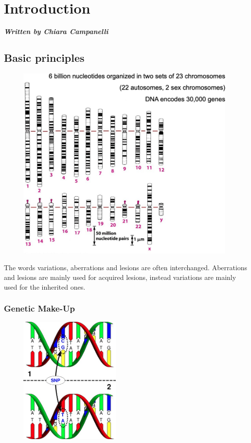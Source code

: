 \graphicspath{{chapters/ThebasicsImages/}}


\chapter{Introduction}

\textbf{\textit{Written by Chiara Campanelli}}

\section{Basic principles} \label{chap: Basics}

\begin{figure}[H]
  \includegraphics[width=4.32507in,height=3.86281in]{image1.jpeg}
  \centering
  \caption{}
\end{figure}


The words variations, aberrations and lesions are often interchanged.
Aberrations and lesions are mainly used for acquired lesions, instead variations
are mainly used for the inherited ones.

\hypertarget{genetic-make-up}{%
\subsection{Genetic Make-Up}\label{genetic-make-up}}

\begin{figure}[H]
  \includegraphics[width=1.97816in,height=2.50248in]{image2.jpeg}
  \centering
  \caption{}
  \label{fig: SNP}
\end{figure}


